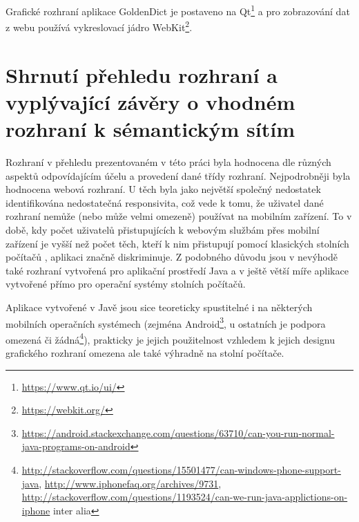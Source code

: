 \documentclass[a4paper, 11pt, oneside]{book}
\begin{document}
				Grafické rozhraní aplikace GoldenDict je postaveno na Qt\footnote{\url{https://www.qt.io/ui/}} a pro zobrazování dat z webu používá vykreslovací jádro WebKit\footnote{\url{https://webkit.org/}}. \parencite{goldendict2016}


		\chapter{Shrnutí přehledu rozhraní a vyplývající závěry o vhodném rozhraní k sémantickým sítím}


			Rozhraní v přehledu prezentovaném v této práci byla hodnocena dle různých aspektů odpovídajícím účelu a provedení dané třídy rozhraní. Nejpodrobněji byla hodnocena webová rozhraní. U těch byla jako největší společný nedostatek identifikována nedostatečná responsivita, což vede k tomu, že uživatel dané rozhraní nemůže (nebo může velmi omezeně) používat na mobilním zařízení. To v době, kdy počet uživatelů přistupujících k webovým službám přes mobilní zařízení je vyšší než počet těch, kteří k nim přistupují pomocí klasických stolních počítačů \parencite{Heisler2016}, aplikaci značně diskriminuje. Z podobného důvodu jsou v nevýhodě také rozhraní vytvořená pro aplikační prostředí Java a v ještě větší míře aplikace vytvořené přímo pro operační systémy stolních počítačů. 

			Aplikace vytvořené v Javě jsou sice teoreticky spustitelné i na některých mobilních operačních systémech (zejména Android\footnote{\url{https://android.stackexchange.com/questions/63710/can-you-run-normal-java-programs-on-android}}, u ostatních je podpora omezená či žádná\footnote{\url{http://stackoverflow.com/questions/15501477/can-windows-phone-support-java}, \url{http://www.iphonefaq.org/archives/9731}, \url{http://stackoverflow.com/questions/1193524/can-we-run-java-applictions-on-iphone} inter alia}), prakticky je jejich použitelnost vzhledem k jejich designu grafického rozhraní omezena ale také výhradně na stolní počítače. 
\end{document}
